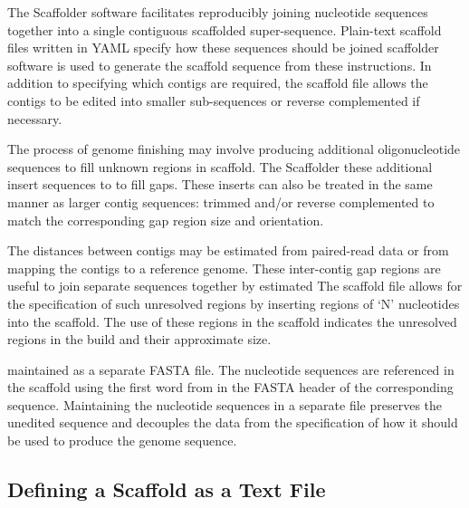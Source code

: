 \documentclass[10pt]{bmc_article}
\newenvironment{bmcformat}{\begin{raggedright}\baselineskip20pt\sloppy\setboolean{publ}{false}}{\end{raggedright}\baselineskip20pt\sloppy}
\begin{document}
\begin{bmcformat}
The Scaffolder software facilitates reproducibly joining nucleotide sequences
together into a single contiguous scaffolded super-sequence. Plain-text
scaffold files written in  YAML  specify how these
sequences should be joined scaffolder software is used
to generate the scaffold sequence from these instructions. In addition to
specifying which contigs are required, the scaffold file allows the contigs to
be edited into smaller sub-sequences or reverse complemented if necessary.\pb

The process of genome finishing may involve producing additional
oligonucleotide sequences to fill unknown regions in  scaffold.
 The Scaffolder  these
additional insert sequences to  to fill  gaps.
These inserts can also be treated in the same manner as larger contig
sequences: trimmed and/or reverse complemented to match the corresponding gap
region size and orientation. \pb

The distances between contigs may be estimated from paired-read data or from
mapping the contigs to a reference genome. These inter-contig gap regions are
useful to join separate sequences together by  estimated
 The scaffold file allows for the specification
of such unresolved regions by inserting regions of `N' nucleotides into the
scaffold. The use of these regions in the scaffold indicates the unresolved
regions in the build and their approximate size. \pb


 maintained as
a separate FASTA file. The nucleotide sequences
 are referenced in the scaffold using the
first word from in the FASTA header of the corresponding sequence. Maintaining
the nucleotide sequences in a separate file preserves the unedited sequence
and decouples the data from the specification of how it should be used to
produce the genome sequence. \pb

\subsection*{Defining a Scaffold as a Text File} %


\end{bmcformat}
\end{document}
